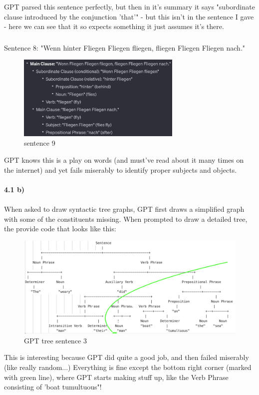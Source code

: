 \documentclass{article}
\begin{document}
GPT parsed this sentence perfectly, but then in it's summary it says "subordinate clause introduced by the conjunction 'that'" - but this isn't in the sentence I gave - here we can see that it so expects something it just assumes it's there. 

\subsubsection{}	%
Sentence 8: "Wenn hinter Fliegen Fliegen fliegen, fliegen Fliegen Fliegen nach." \\
\begin{figure}[H]
  \centering
  \includegraphics[width=0.7\textwidth]{sen9.png} 
  \caption{sentence 9}
\end{figure}


GPT knows this is a play on words (and must've read about it many times on the internet) and yet fails miserably to identify proper subjects and objects. 
\\ \\
\textbf{4.1 b)} \\ \\
When asked to draw syntactic tree graphs, GPT first draws a simplified graph with some of the constituents missing. When prompted to draw a detailed tree, the provide code that looks like this: 
\begin{figure}[H]
  \centering
  \includegraphics[width=1\textwidth]{b3.png} 
  \caption{GPT tree sentence 3}
\end{figure}
This is interesting because GPT did quite a good job, and then failed miserably (like really random...) Everything is fine except the bottom right corner (marked with green line), where GPT starts making stuff up, like the Verb Phrase consisting of 'boat tumultuous"!
\end{document}
